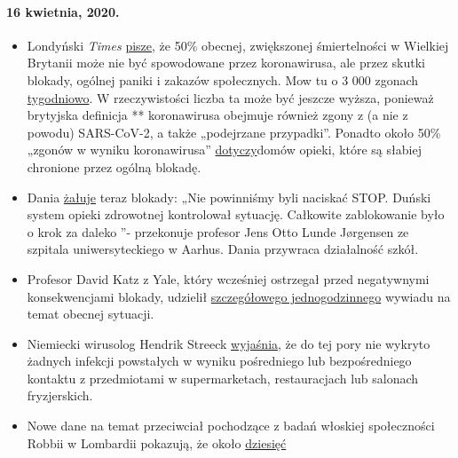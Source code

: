 \hypertarget{16-kwietnia-2020}{%
\paragraph{16 kwietnia, 2020.}\label{16-kwietnia-2020}}

\begin{itemize}
\tightlist
\item
  Londyński \emph{Times} \href{https://archive.is/2eKCW}{pisze}, że 50\%
  obecnej, zwiększonej śmiertelności w Wielkiej Brytanii może nie być
  spowodowane przez koronawirusa, ale przez skutki blokady, ogólnej
  paniki i zakazów społecznych. Mow tu o 3 000 zgonach
  \href{https://www.ons.gov.uk/peoplepopulationandcommunity/birthsdeathsandmarriages/deaths/bulletins/deathsregisteredweeklyinenglandandwalesprovisional/weekending3april2020}{tygodniowo}.
  W rzeczywistości liczba ta może być jeszcze wyższa, ponieważ brytyjska
  definicja ** koronawirusa obejmuje również zgony z (a nie z powodu)
  SARS-CoV-2, a także „podejrzane przypadki''. Ponadto około 50\%
  „zgonów w wyniku koronawirusa''
  \href{https://ltccovid.org/2020/04/12/mortality-associated-with-covid-19-outbreaks-in-care-homes-early-international-evidence/}{dotyczy}domów
  opieki, które są słabiej chronione przez ogólną blokadę.
\item
  Dania
  \href{https://jyllands-posten.dk/debat/breve/ECE12074246/vi-skulle-aldrig-have-trykket-paa-stopknappen/}{żałuje}
  teraz blokady: „Nie powinniśmy byli naciskać STOP. Duński system
  opieki zdrowotnej kontrolował sytuację. Całkowite zablokowanie było o
  krok za daleko ''- przekonuje profesor Jens Otto Lunde Jørgensen ze
  szpitala uniwersyteckiego w Aarhus. Dania przywraca działalność szkół.
\item
  Profesor David Katz z Yale, który wcześniej ostrzegał przed
  negatywnymi konsekwencjami blokady, udzielił
  \href{https://www.youtube.com/watch?v=VK0Wtjh3HVA}{szczegółowego
  jednogodzinnego} wywiadu na temat obecnej sytuacji.
\item
  Niemiecki wirusolog Hendrik Streeck
  \href{https://today.rtl.lu/news/science-and-environment/a/1498185.html}{wyjaśnia},
  że do tej pory nie wykryto żadnych infekcji powstałych w wyniku
  pośredniego lub bezpośredniego kontaktu z przedmiotami w
  supermarketach, restauracjach lub salonach fryzjerskich.
\item
  Nowe dane na temat przeciwciał pochodzące z badań włoskiej
  społeczności Robbii w Lombardii pokazują, że około
  \href{https://www.tgcom24.mediaset.it/cronaca/a-robbio-pv-il-22-ha-o-ha-avuto-il-coronavirus-ok-del-sindaco-ai-test-per-tutti_17285128-202002a.shtml}{dziesięć
}
\end{itemize}
